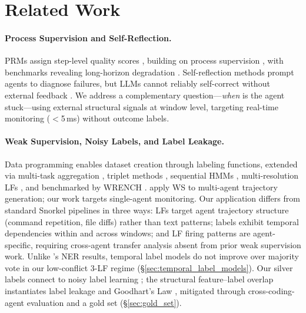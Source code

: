 \section{Related Work}
\label{sec:related_work}

\paragraph{Process Supervision and Self-Reflection.}
PRMs assign step-level quality scores \citep{xi2025agentprm,choudhury2025prm,fan2026agentrm}, building on process supervision \citep{lightman2024letsverify,uesato2022processfeedback}, with benchmarks revealing long-horizon degradation \citep{wang2026planrewardbench,li2026toolprmbench}.
Self-reflection methods \citep{shinn2023reflexion,yao2023react,yao2023tot,zhou2024lats} prompt agents to diagnose failures, but LLMs cannot reliably self-correct without external feedback \citep{huang2024selfcorrect,kamoi2024selfcorrection}.
We address a complementary question---\emph{when} is the agent stuck---using external structural signals at window level, targeting real-time monitoring ($<$5\,ms) without outcome labels.

\paragraph{Weak Supervision, Noisy Labels, and Label Leakage.}
Data programming \citep{ratner2016dataprogramming,ratner2019snorkel} enables dataset creation through labeling functions, extended via multi-task aggregation \citep{ratner2019snorkelmetal}, triplet methods \citep{fu2020flyingsquid}, sequential HMMs \citep{safranchik2020linkedhmm}, multi-resolution LFs \citep{sala2019multiresolution}, and benchmarked by WRENCH \citep{zhang2021wrench}. \citet{zhan2019multi} apply WS to multi-agent trajectory generation; our work targets single-agent monitoring.
Our application differs from standard Snorkel pipelines in three ways: LFs target agent trajectory structure (command repetition, file diffs) rather than text patterns; labels exhibit temporal dependencies within and across windows; and LF firing patterns are agent-specific, requiring cross-agent transfer analysis absent from prior weak supervision work.
Unlike \citeauthor{safranchik2020linkedhmm}'s NER results, temporal label models do not improve over majority vote in our low-conflict 3-LF regime (\S\ref{sec:temporal_label_models}).
Our silver labels connect to noisy label learning \citep{han2018coteaching,li2020dividemix}; the structural feature--label overlap instantiates label leakage \citep{kaufman2012leakage} and Goodhart's Law \citep{manheim2018goodhart}, mitigated through cross-coding-agent evaluation and a gold set (\S\ref{sec:gold_set}).

